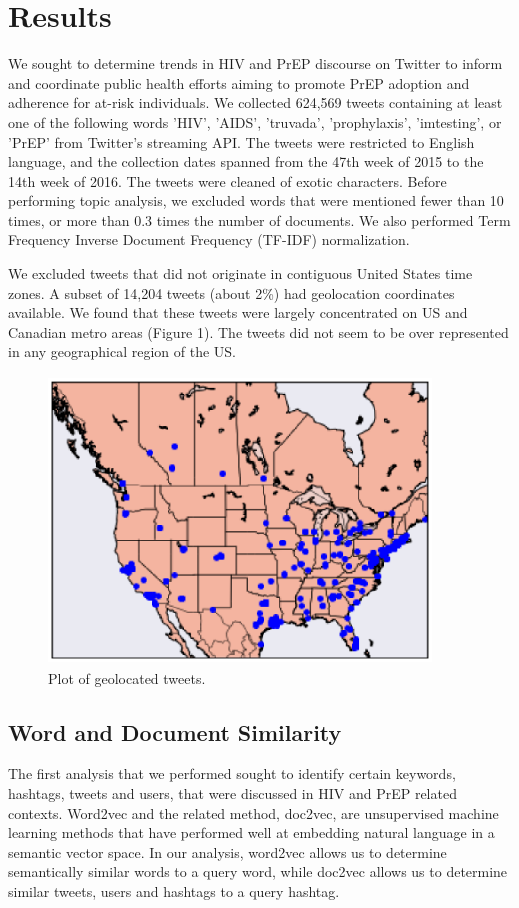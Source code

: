 \documentclass{sig-alternate-05-2015}
\begin{document}
\section{Results}
We sought to determine trends in HIV and PrEP discourse on Twitter to inform and coordinate public health efforts aiming to promote PrEP adoption and adherence for at-risk individuals. We collected 624,569 tweets containing at least one of the following words 'HIV', 'AIDS', 'truvada', 'prophylaxis', 'imtesting', or 'PrEP' from Twitter's streaming API. The tweets were restricted to English language, and the collection dates spanned from the 47th week of 2015 to the 14th week of 2016. The tweets were cleaned of exotic characters. Before performing topic analysis, we excluded words that were mentioned fewer than 10 times, or more than 0.3 times the number of documents. We also performed Term Frequency Inverse Document Frequency (TF-IDF) normalization.

We excluded tweets that did not originate in contiguous United States time zones. A subset of 14,204 tweets (about 2\%) had geolocation coordinates available. We found that these tweets were largely concentrated on US and Canadian metro areas (Figure 1). The tweets did not seem to be over represented in any geographical region of the US.

\begin{figure}
\centering
\includegraphics[height=3in, width=4in]{map}
\caption{Plot of geolocated tweets.}
\end{figure}

\subsection{Word and Document Similarity}

The first analysis that we performed sought to identify certain keywords, hashtags, tweets and users, that were discussed in HIV and PrEP related contexts. Word2vec and the related method, doc2vec, are unsupervised machine learning methods that have performed well at embedding natural language in a semantic vector space. In our analysis, word2vec allows us to determine semantically similar words to a query word, while doc2vec allows us to determine similar tweets, users and hashtags to a query hashtag.
\end{document}
